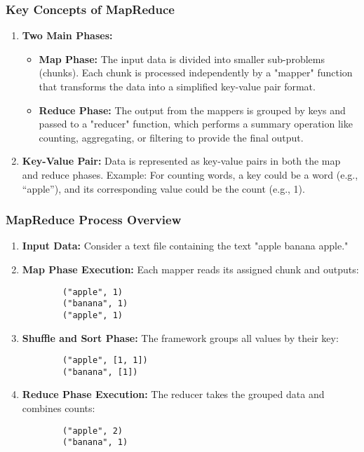 \documentclass[aspectratio=169]{beamer}
\begin{document}
\begin{frame}[fragile]
    \frametitle{Key Concepts of MapReduce}
    
    \begin{enumerate}
        \item \textbf{Two Main Phases:}
        \begin{itemize}
            \item \textbf{Map Phase:} 
            The input data is divided into smaller sub-problems (chunks). Each chunk is processed independently by a "mapper" function that transforms the data into a simplified key-value pair format.
            \item \textbf{Reduce Phase:} 
            The output from the mappers is grouped by keys and passed to a "reducer" function, which performs a summary operation like counting, aggregating, or filtering to provide the final output.
        \end{itemize}

        \item \textbf{Key-Value Pair:}
        Data is represented as key-value pairs in both the map and reduce phases. 
        Example: For counting words, a key could be a word (e.g., “apple”), and its corresponding value could be the count (e.g., 1).
    \end{enumerate}
\end{frame}

\begin{frame}[fragile]
    \frametitle{MapReduce Process Overview}
    
    \begin{enumerate}
        \item \textbf{Input Data:} 
        Consider a text file containing the text "apple banana apple."
        
        \item \textbf{Map Phase Execution:} 
        Each mapper reads its assigned chunk and outputs:
        \begin{lstlisting}
        ("apple", 1)
        ("banana", 1)
        ("apple", 1)
        \end{lstlisting}

        \item \textbf{Shuffle and Sort Phase:} 
        The framework groups all values by their key:
        \begin{lstlisting}
        ("apple", [1, 1])
        ("banana", [1])
        \end{lstlisting}

        \item \textbf{Reduce Phase Execution:} 
        The reducer takes the grouped data and combines counts:
        \begin{lstlisting}
        ("apple", 2)
        ("banana", 1)
        \end{lstlisting}
    \end{enumerate}
\end{frame}
\end{document}
